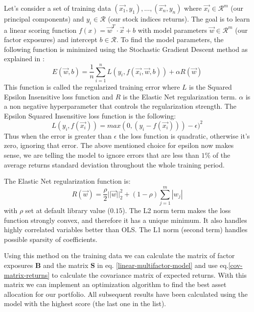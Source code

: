 Let's consider a set of training data $(\vec{x_1}, y_1),\dots,(\vec{x_n}, y_n)$ where $\vec{x_i} \in \mathcal{R}^m$ (our principal components) and $y_i \in \mathcal{R}$ (our stock indices returns). The goal is to learn a linear scoring function $f(x) = \vec{w}^{T}\cdot\vec{x} + b$ with model parameters $\vec{w} \in \mathcal{R}^m$ (our factor exposures) and intercept $b \in \mathcal{R}$.
To find the model parameters, the following function is minimized using the Stochastic Gradient Descent method as explained in \cite{sgd-paper}:
\begin{equation}
	E(\vec{w},b) = \frac{1}{n} \sum_{i=1}^n L(y_i, f(\vec{x_i}, \vec{w}, b)) + \alpha R(\vec{w})
	\label{reg-train-error}
\end{equation}
This function is called the regularized training error where $L$ is the Squared Epsilon Insensitive loss function and $R$ is the Elastic Net regularization term. $\alpha$ is a non negative hyperparameter that controls the regularization strength.
The Epsilon Squared Insensitive loss function is the following:
\begin{equation}
	L(y_i, f(\vec{x_i})) = max(0, (y_i - f(\vec{x_i}))) - \epsilon)^2
	\label{sq-ins-epsilon}
\end{equation}
Thus when the error is greater than $\epsilon$ the loss function is quadratic, otherwise it's zero, ignoring that error. The above mentioned choice for epsilon now makes sense, we are telling the model to ignore errors that are less than $1\%$ of the average returns standard deviation throughout the whole training period.

The Elastic Net regularization function is:
\begin{equation}
	R(\vec{w}) = \frac{\rho}{2} ||\vec{w}||_{2}^2 + (1-\rho)\sum_{j = 1}^{m} |w_j|
\end{equation}
with $\rho$ set at default library value ($0.15$). The L2 norm term makes the loss function strongly convex, and therefore it has a unique minimum. It also handles highly correlated variables better than OLS. The L1 norm (second term) handles possible sparsity of coefficients.

Using this method on the training data we can calculate the matrix of factor exposures $\mathbf{B}$ and the matrix $\mathbf{S}$ in eq. \eqref{linear-multifactor-model} and use eq.\eqref{cov-matrix-returns} to calculate the covariance matrix of expected returns. With this matrix we can implement an optimization algorithm to find the best asset allocation for our portfolio.
All subsequent results have been calculated using the model with the highest score (the last one in the list).

